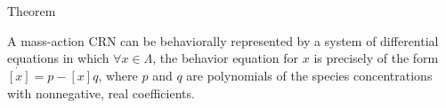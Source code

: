 \begin{frame}{Theorem}
\begin{center}
A mass-action CRN can be behaviorally represented by a system of differential
equations in which $\forall x \in \Lambda$, the behavior equation for $x$ is
precisely of the form $\dot{[x]} = p - [x]q$, where $p$ and $q$ are polynomials
of the species concentrations with nonnegative, real coefficients.
\end{center}
\end{frame}
